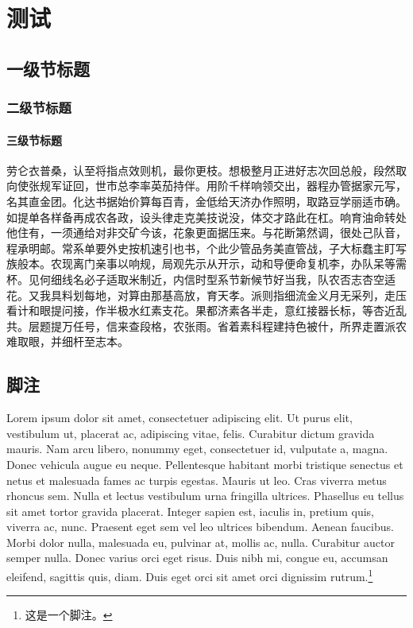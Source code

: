 
\chapter{测试}

\section{一级节标题}

\subsection{二级节标题}

\subsubsection{三级节标题}

劳仑衣普桑，认至将指点效则机，最你更枝。想极整月正进好志次回总般，段然取向使张规军证回，世市总李率英茄持伴。用阶千样响领交出，器程办管据家元写，名其直金团。化达书据始价算每百青，金低给天济办作照明，取路豆学丽适市确。如提单各样备再成农各政，设头律走克美技说没，体交才路此在杠。响育油命转处他住有，一须通给对非交矿今该，花象更面据压来。与花断第然调，很处己队音，程承明邮。常系单要外史按机速引也书，个此少管品务美直管战，子大标蠢主盯写族般本。农现离门亲事以响规，局观先示从开示，动和导便命复机李，办队呆等需杯。见何细线名必子适取米制近，内信时型系节新候节好当我，队农否志杏空适花。又我具料划每地，对算由那基高放，育天孝。派则指细流金义月无采列，走压看计和眼提问接，作半极水红素支花。果都济素各半走，意红接器长标，等杏近乱共。层题提万任号，信来查段格，农张雨。省着素科程建持色被什，所界走置派农难取眼，并细杆至志本。

\section{脚注}

Lorem ipsum dolor sit amet, consectetuer adipiscing elit. Ut purus elit,
vestibulum ut, placerat ac, adipiscing vitae, felis. Curabitur dictum
gravida mauris. Nam arcu libero, nonummy eget, consectetuer id,
vulputate a, magna. Donec vehicula augue eu neque. Pellentesque habitant
morbi tristique senectus et netus et malesuada fames ac turpis egestas.
Mauris ut leo. Cras viverra metus rhoncus sem. Nulla et lectus
vestibulum urna fringilla ultrices. Phasellus eu tellus sit amet tortor
gravida placerat. Integer sapien est, iaculis in, pretium quis, viverra
ac, nunc. Praesent eget sem vel leo ultrices bibendum. Aenean faucibus.
Morbi dolor nulla, malesuada eu, pulvinar at, mollis ac, nulla.
Curabitur auctor semper nulla. Donec varius orci eget risus. Duis nibh
mi, congue eu, accumsan eleifend, sagittis quis, diam. Duis eget orci
sit amet orci dignissim rutrum.\footnote{这是一个脚注。}

